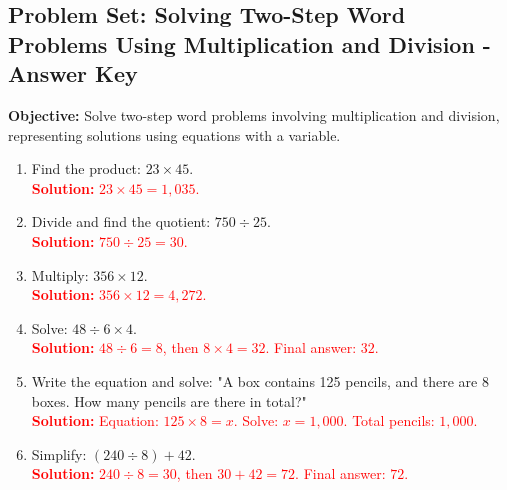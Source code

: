 \documentclass[12pt]{article}
\title{}
\date{}
\begin{document}
\subsection*{Problem Set: Solving Two-Step Word Problems Using Multiplication and Division - Answer Key}
\onehalfspacing

\begin{tcolorbox}[colframe=black!40, colback=gray!5, 
coltitle=black, colbacktitle=black!20, fonttitle=\bfseries\Large, 
title=Learning Objective, halign title=center, left=5pt, right=5pt, top=5pt, bottom=15pt]
\textbf{Objective:} Solve two-step word problems involving multiplication and division, representing solutions using equations with a variable.
\end{tcolorbox}

\begin{tcolorbox}[colframe=black!60, colback=white, 
coltitle=black, colbacktitle=black!15, fonttitle=\bfseries\Large, 
title=Exercises, halign title=center, left=10pt, right=10pt, top=10pt, bottom=60pt]
\begin{enumerate}[itemsep=3em]
    \item Find the product: \( 23 \times 45 \).\\
    \textcolor{red}{\textbf{Solution:} \( 23 \times 45 = 1,035 \).}

    \item Divide and find the quotient: \( 750 \div 25 \).\\
    \textcolor{red}{\textbf{Solution:} \( 750 \div 25 = 30 \).}

    \item Multiply: \( 356 \times 12 \).\\
    \textcolor{red}{\textbf{Solution:} \( 356 \times 12 = 4,272 \).}

    \item Solve: \( 48 \div 6 \times 4 \).\\
    \textcolor{red}{\textbf{Solution:} \( 48 \div 6 = 8 \), then \( 8 \times 4 = 32 \). Final answer: \( 32 \).}

    \item Write the equation and solve: "A box contains 125 pencils, and there are 8 boxes. How many pencils are there in total?"\\
    \textcolor{red}{\textbf{Solution:} 
    Equation: \( 125 \times 8 = x \). 
    Solve: \( x = 1,000 \). Total pencils: \( 1,000 \).}

    \item Simplify: \( (240 \div 8) + 42 \).\\
    \textcolor{red}{\textbf{Solution:} \( 240 \div 8 = 30 \), then \( 30 + 42 = 72 \). Final answer: \( 72 \).}


\end{enumerate}
\end{tcolorbox}
\end{document}
